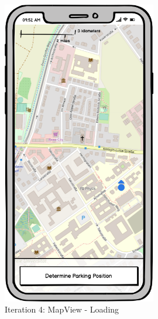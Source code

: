 \begin{figure}[H]
  \centering
  \begin{minipage}[b]{0.45\textwidth}
    \centering
    \includegraphics[width=0.6\textwidth]{images/UI/Iteration4-MapView-Loading.png}
    \caption{Iteration 4: MapView - Loading}
    \label{fig:i4-mv-loading}
  \end{minipage}
  \hfill
  \begin{minipage}[b]{0.45\textwidth}
    \centering

\end{minipage}
\end{figure}
